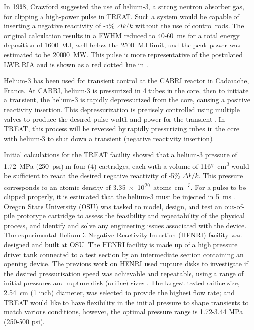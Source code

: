 In 1998, Crawford \cite{Crawford1998} suggested the use of helium-3, a strong neutron absorber gas, for clipping a high-power pulse in TREAT. Such a system would be capable of inserting a negative reactivity of -5\% $\Delta k/k$ without the use of control rods. The original calculation results in a FWHM reduced to 40-\SI{60}{\milli\second} for a total energy deposition of \SI{1600}{\mega\joule}, well below the \SI{2500}{\mega\joule} limit, and the peak power was estimated to be \SI{20000}{\mega\watt}. This pulse is more representative of the postulated LWR RIA and is shown as a red dotted line in .

Helium-3 has been used for transient control at the CABRI reactor in Cadarache, France. At CABRI, helium-3 is pressurized in 4 tubes in the core, then to initiate a transient, the helium-3 is rapidly depressurized from the core, causing a positive reactivity insertion. This depressurization is precisely controlled using multiple valves to produce the desired pulse width and power for the transient \cite{Clamens2016,Clamens2018,Clamens2018b}. In TREAT, this process will be reversed by rapidly pressurizing tubes in the core with helium-3 to shut down a transient (negative reactivity insertion).

Initial calculations for the TREAT facility showed that a helium-3 pressure of \SI{1.72}{\mega\pascal} (\SI{250}{psi}) in four (4) cartridges, each with a volume of \SI{1167}{\centi\meter^3} would be sufficient to reach the desired negative reactivity of -5\% $\Delta k/k$. This pressure corresponds to an atomic density of \SI{3.35e20}{atoms\per\centi\meter^3}. For a pulse to be clipped properly, it is estimated that the helium-3 must be injected in \SI{5}{\milli\second} \cite{BESS2019}. Oregon State University (OSU) was tasked to model, design, and test an out-of-pile prototype cartridge to assess the feasibility and repeatability of the physical process, and identify and solve any engineering issues associated with the device. The experimental Helium-3 Negative Reactivity Insertion (HENRI) facility was designed and built at OSU. The HENRI facility is made up of a high pressure driver tank connected to a test section by an intermediate section containing an opening device. The previous work on HENRI used rupture disks to investigate if the desired pressurization speed was achievable and repeatable, using a range of initial pressures and rupture disk (orifice) sizes \cite{HeNURETH}. The largest tested orifice size, \SI{2.54}{\centi\meter} (1 inch) diameter, was selected to provide the highest flow rate; and TREAT would like to have flexibility in the initial pressure to shape transients to match various conditions, however, the optimal pressure range is 1.72-3.44 \si{\mega\pascal} (250-500 psi).



